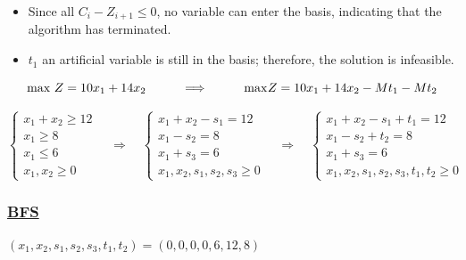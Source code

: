\begin{itemize}
    \item Since all \hspace{0.2cm}\(C_i - Z_{i+1} \leq 0\)\hspace{0.2cm}, no variable can enter the basis, indicating that the algorithm has terminated.
    \item \(t_1\) an artificial variable is still in the basis; therefore, the solution is infeasible.
\end{itemize}

\vspace{1cm}

\[\text{max } Z = 10x_1 + 14x_2 \hspace{1cm} \Longrightarrow \hspace{1cm} \text{max } \hspace{-0.1cm}Z = 10x_1 + 14x_2 - Mt_1 - Mt_2\] 

\[
\left\{
\begin{array}{l}
    x_{1} + x_{2} \geq 12 \\
    x_{1} \geq 8 \\
    x_{1} \leq 6 \\
    x_{1}, x_{2}\geq 0
\end{array}
\right.
\quad
\Longrightarrow
\quad
\left\{
\begin{array}{l}
    x_{1} + x_{2} - s_{1} = 12 \\
    x_{1} - s_{2} = 8 \\
    x_{1} + s_{3} = 6 \\
    x_{1}, x_{2}, s_{1}, s_{2}, s_{3}\geq 0
\end{array}
\right.
\quad
\Longrightarrow
\quad
\left\{
\begin{array}{l}
    x_{1} + x_{2} - s_{1} + t_{1} = 12 \\
    x_{1} - s_{2} + t_{2} = 8 \\
    x_{1} + s_{3} = 6 \\
    x_{1}, x_{2}, s_{1}, s_{2}, s_{3}, t_{1}, t_{2}\geq 0
\end{array}
\right.
\]


\vspace{1.5cm}


\subsubsection*{\underline{BFS}}
\((x_1,x_2,s_1,s_2,s_3,t_1,t_2) = (0,0,0,0,6,12,8)\)

